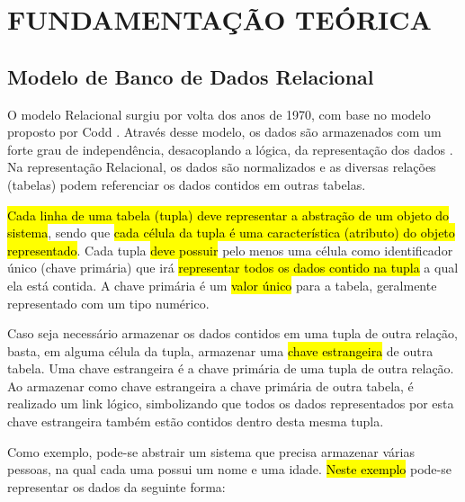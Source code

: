 \chapter{FUNDAMENTAÇÃO TEÓRICA}
\label{FundamentacaoTeorica}

\section{Modelo de Banco de Dados Relacional}

O modelo Relacional surgiu por volta dos anos de 1970, com base no modelo proposto por Codd \cite{codd1970relational}. Através desse modelo, os dados são armazenados com um forte grau de independência, desacoplando a lógica, da representação dos dados \cite{davoudian2018survey}. Na representação Relacional, os dados são normalizados e as diversas relações (tabelas) podem referenciar os dados contidos em outras tabelas.

\hl{Cada linha de uma tabela (tupla) deve representar a abstração de um objeto do sistema}, sendo que \hl{cada célula da tupla é uma característica (atributo) do objeto representado}. Cada tupla \hl{deve possuir} pelo menos uma célula como identificador único (chave primária) que irá \hl{representar todos os dados contido na tupla} a qual ela está contida. A chave primária é um \hl{valor único} para a tabela, geralmente representado com um tipo numérico.


Caso seja necessário armazenar os dados contidos em uma tupla de outra relação, basta, em alguma célula da tupla, armazenar uma \hl{chave estrangeira} de outra tabela. Uma chave estrangeira é a chave primária de uma tupla de outra relação. Ao armazenar como chave estrangeira a chave primária de outra tabela, é realizado um link lógico, simbolizando que todos os dados representados por esta chave estrangeira também estão contidos dentro desta mesma tupla.


Como exemplo, pode-se abstrair um sistema que precisa armazenar várias pessoas, na qual cada uma possui um nome e uma idade. \hl{Neste exemplo} pode-se representar os dados da seguinte forma:

